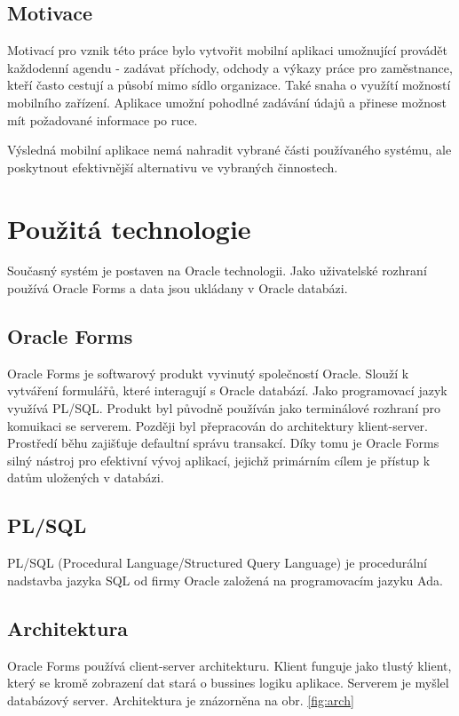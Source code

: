 \documentclass{diplomka}
\begin{document}
\subsection{Motivace}
Motivací pro vznik této práce bylo vytvořit mobilní aplikaci umožnující provádět každodenní agendu - zadávat příchody, odchody a výkazy práce pro zaměstnance, kteří často cestují a působí mimo sídlo organizace. Také snaha o využítí možností mobilního zařízení. Aplikace umožní pohodlné zadávání údajů a přinese možnost mít požadované informace po ruce.

Výsledná mobilní aplikace nemá nahradit vybrané části používaného systému, ale poskytnout efektivnější alternativu ve vybraných činnostech.


\section{Použitá technologie}
Současný systém je postaven na Oracle technologii. Jako uživatelské rozhraní používá Oracle Forms a data jsou ukládany v Oracle databázi.
 
\subsection{Oracle Forms}
Oracle Forms\cite{forms} je softwarový produkt vyvinutý společností Oracle. Slouží k vytváření formulářů, které interagují s Oracle databází. Jako programovací jazyk využívá PL/SQL. Produkt byl původně používán jako terminálové rozhraní pro komuikaci se serverem. Později byl přepracován do architektury klient-server.\\ \indent
Prostředí běhu zajišťuje defaultní správu transakcí. Díky tomu je Oracle Forms silný nástroj pro efektivní vývoj aplikací, jejichž primárním cílem je přístup k datům uložených v databázi. 

\subsection*{PL/SQL}
PL/SQL (Procedural Language/Structured Query Language) je procedurální nadstavba jazyka SQL od firmy Oracle založená na programovacím jazyku Ada.
\newpage
\subsection{Architektura}
Oracle Forms používá client-server architekturu. Klient funguje jako tlustý klient, který se kromě zobrazení dat stará o bussines logiku aplikace. Serverem je myšlel databázový server. Architektura je znázorněna na obr. \ref{fig:arch}
\end{document}
